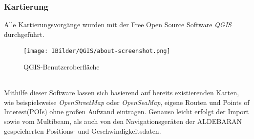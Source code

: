 \subsubsection{Kartierung}
Alle Kartierungsvorgänge wurden mit der Free Open Source Software \emph{QGIS}\cite{qgis}\\durchgeführt.
\begin{figure}[ht]
    \centering
    \texttt{[image: IBilder/QGIS/about-screenshot.png]}
    \caption[fig:qgisabout]{QGIS-Benutzeroberfläche}
\end{figure}
\\Mithilfe dieser Software lassen sich basierend auf bereits existierenden Karten, 
wie beispielsweise \emph{OpenStreetMap}\cite{ostrm} oder \emph{OpenSeaMap}\cite{oseam}, eigene Routen und Points of \\Interest(POIs) ohne großen 
Aufwand eintragen. Genauso leicht erfolgt der Import sowie vom Multibeam,  als auch von den Navigationsgeräten der ALDEBARAN gespeicherten 
Positions-  und Geschwindigkeitsdaten.
